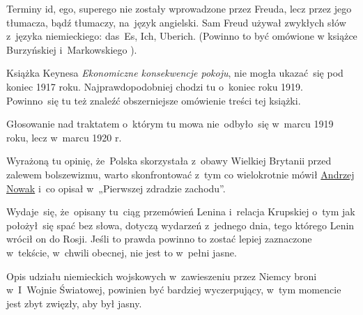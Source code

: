 \documentclass[a4paper,11pt]{article}
\numberwithin{equation}{section}
\begin{document}
\vspace{0em}



\vspace{0em}


\noindent
{} Terminy id, ego, superego nie zostały wprowadzone przez Freuda,
lecz przez jego tłumacza, bądź tłumaczy, na~język angielski. Sam Freud
używał zwykłych słów z~języka niemieckiego: das~Es, Ich, Uberich. (Powinno
to być omówione w książce Burzyńskiej i~Markowskiego \cite{BM09}).

\VerSpaceFour





\noindent
{} Książka Keynesa \textit{Ekonomiczne konsekwencje pokoju}, nie
mogła ukazać~się pod koniec 1917 roku. Najprawdopodobniej chodzi tu
o~koniec roku 1919. Powinno~się tu też znaleźć obszerniejsze omówienie
treści tej książki.

\VerSpaceFour





\noindent
{} Głosowanie nad traktatem o~którym tu mowa nie~odbyło~się w~marcu
1919 roku, lecz w~marcu 1920 r.

\VerSpaceFour





\noindent
{} Wyrażoną tu opinię, że~Polska skorzystała z~obawy Wielkiej
Brytanii przed zalewem bolszewizmu, warto skonfrontować z~tym co
wielokrotnie mówił
\href{https://www.youtube.com/watch?v=yfQ7rpq_irA}{Andrzej Nowak} i~co
opisał w~„Pierwszej zdradzie zachodu”.

\VerSpaceFour





\noindent
{} Wydaje~się, że~opisany tu~ciąg przemówień Lenina i~relacja
Krupskiej o~tym jak położył~się spać bez słowa, dotyczą wydarzeń z~jednego
dnia, tego którego Lenin wrócił on do Rosji. Jeśli to prawda powinno to
zostać lepiej zaznaczone w~tekście, w~chwili obecnej, nie jest to w~pełni
jasne.

\VerSpaceFour





\noindent
{} Opis udziału niemieckich wojskowych w~zawieszeniu przez Niemcy
broni w~I~Wojnie Światowej, powinien być bardziej wyczerpujący, w~tym
momencie jest zbyt zwięzły, aby był jasny.
\end{document}
